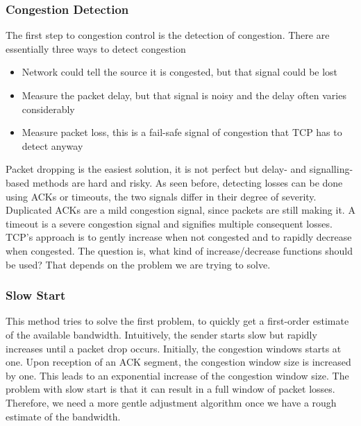\subsubsection{Congestion Detection}
The first step to congestion control is the detection of congestion. There are essentially three ways to detect congestion
\begin{itemize}
\item Network could tell the source it is congested, but that signal could be lost
\item Measure the packet delay, but that signal is noisy and the delay often varies considerably
\item Measure packet loss, this is a fail-safe signal of congestion that TCP has to detect anyway
\end{itemize}
Packet dropping is the easiest solution, it is not perfect but delay- and signalling-based methods are hard and risky. As seen before, detecting losses can be done using ACKs or timeouts, the two signals differ in their degree of severity. Duplicated ACKs are a mild congestion signal, since packets are still making it. A timeout is a severe congestion signal and signifies multiple consequent losses. \vspace{.3cm}\\

TCP's approach is to gently increase when not congested and to rapidly decrease when congested. The question is, what kind of increase/decrease functions should be used? That depends on the problem we are trying to solve.

\subsubsection{Slow Start}
This method tries to solve the first problem, to quickly get a first-order estimate of the available bandwidth. Intuitively, the sender starts slow but rapidly increases until a packet drop occurs. Initially, the congestion windows starts at one. Upon reception of an ACK segment, the congestion window size is increased by one. This leads to an exponential increase of the congestion window size. The problem with slow start is that it can result in a full window of packet losses. Therefore, we need a more gentle adjustment algorithm once we have a rough estimate of the bandwidth.

